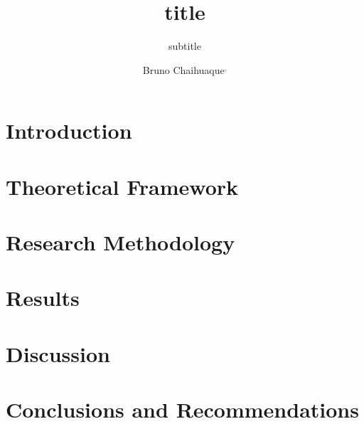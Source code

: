 \documentclass[aspectratio=169]{beamer}
\title{title}
\subtitle{subtitle}
\author{Bruno Chaihuaque\orcidlink{0000-0001-5982-8505}\inst1$^{,}$\inst2}
\begin{document}
		
	
	
	\section{Introduction}
	
	
	\section{Theoretical Framework}
	
	
	\section{Research Methodology}
	
	
	\section{Results}
	
	
	
	\section{Discussion}
	
	
	\section{Conclusions and Recommendations}
	
	
\end{document}
